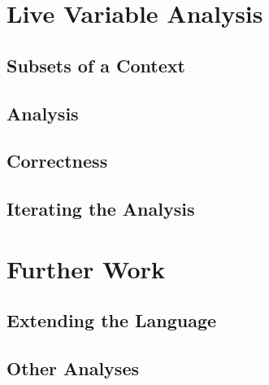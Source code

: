 \documentclass[11pt,a4paper]{article}
\begin{document}
\CodeLangTypes


\CodeLangCtx


\CodeLangRef

\CodeLangExpr


\CodeLangSemantics


\section{Live Variable Analysis}

\subsection{Subsets of a Context}
\cite{chapman2009type}

\CodeSubsetSubset
\CodeSubsetOpSubseteq

\subsection{Analysis}

\CodeLiveExpr

\subsection{Correctness}

\subsection{Iterating the Analysis}


\section{Further Work}

\subsection{Extending the Language}

\subsection{Other Analyses}


{}
\end{document}
